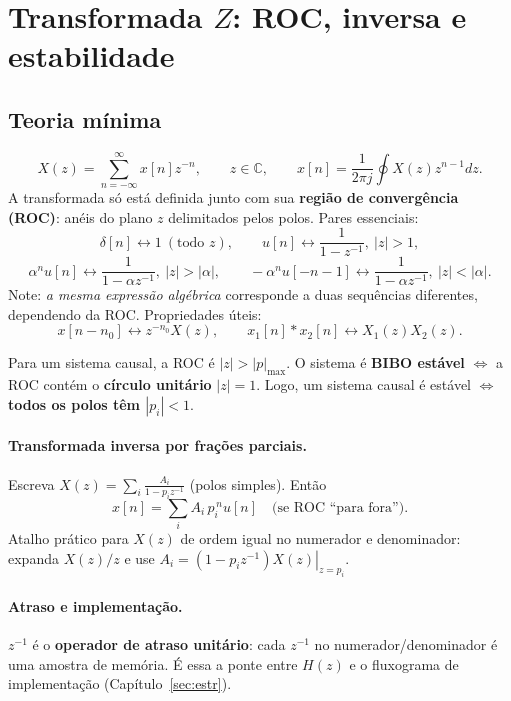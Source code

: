 \section{Transformada $Z$: ROC, inversa e estabilidade}\label{sec:z}

\subsection*{Teoria mínima}

\[
  X(z)=\sum_{n=-\infty}^{\infty}x[n]z^{-n},\qquad z\in\mathbb{C},\qquad
  x[n]=\frac{1}{2\pi j}\oint X(z)z^{n-1}dz .
\]
A transformada só está definida junto com sua \textbf{região de convergência
(ROC)}: anéis do plano $z$ delimitados pelos polos. Pares essenciais:
\[
  \delta[n]\leftrightarrow1\ (\text{todo }z),\qquad
  u[n]\leftrightarrow\frac{1}{1-z^{-1}},\ |z|>1,
\]
\[
  \alpha^nu[n]\leftrightarrow\frac{1}{1-\alpha z^{-1}},\ |z|>|\alpha|,
  \qquad
  -\alpha^nu[-n-1]\leftrightarrow\frac{1}{1-\alpha z^{-1}},\ |z|<|\alpha| .
\]
Note: \emph{a mesma expressão algébrica} corresponde a duas sequências
diferentes, dependendo da ROC. Propriedades úteis:
\[
  x[n-n_0]\leftrightarrow z^{-n_0}X(z),\qquad
  x_1[n]*x_2[n]\leftrightarrow X_1(z)X_2(z).
\]

\begin{teo}
Para um sistema causal, a ROC é $|z|>|p|_{\max}$. O sistema é
\textbf{BIBO estável} $\iff$ a ROC contém o \textbf{círculo unitário}
$|z|=1$. Logo, um sistema causal é estável $\iff$ \textbf{todos os polos têm
$|p_i|<1$}.
\end{teo}

\paragraph{Transformada inversa por frações parciais.} Escreva
$X(z)=\sum_i\frac{A_i}{1-p_iz^{-1}}$ (polos simples). Então
\[
  x[n]=\sum_i A_i\,p_i^{\,n}u[n]\quad\text{(se ROC ``para fora'')}.
\]
Atalho prático para $X(z)$ de ordem igual no numerador e denominador:
expanda $X(z)/z$ e use
$A_i=\left.(1-p_iz^{-1})X(z)\right|_{z=p_i}$.

\paragraph{Atraso e implementação.} $z^{-1}$ é o \textbf{operador de atraso
unitário}: cada $z^{-1}$ no numerador/denominador é uma amostra de memória. É
essa a ponte entre $H(z)$ e o fluxograma de implementação (Capítulo~\ref{sec:estr}).

